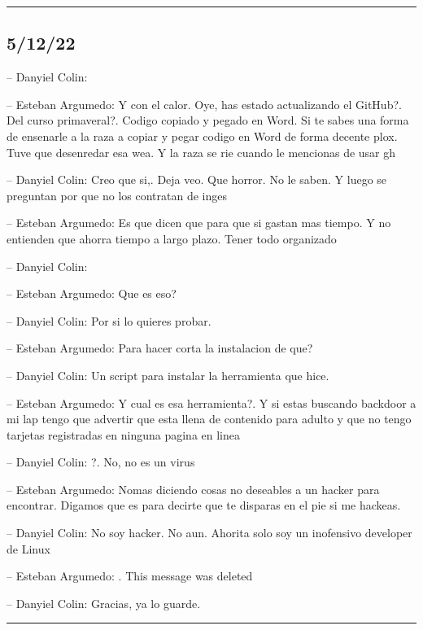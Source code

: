\begin{center}\rule{0.5\linewidth}{0.5pt}\end{center}

\hypertarget{section-76}{%
\subsection{5/12/22}\label{section-76}}

-- Danyiel Colin:

-- Esteban Argumedo: Y con el calor. Oye, has estado actualizando el
GitHub?. Del curso primaveral?. Codigo copiado y pegado en Word. Si te
sabes una forma de ensenarle a la raza a copiar y pegar codigo en Word
de forma decente plox. Tuve que desenredar esa wea. Y la raza se rie
cuando le mencionas de usar gh

-- Danyiel Colin: Creo que si,. Deja veo. Que horror. No le saben. Y
luego se preguntan por que no los contratan de inges

-- Esteban Argumedo: Es que dicen que para que si gastan mas tiempo. Y
no entienden que ahorra tiempo a largo plazo. Tener todo organizado

-- Danyiel Colin:

-- Esteban Argumedo: Que es eso?

-- Danyiel Colin: Por si lo quieres probar.

-- Esteban Argumedo: Para hacer corta la instalacion de que?

-- Danyiel Colin: Un script para instalar la herramienta que hice.

-- Esteban Argumedo: Y cual es esa herramienta?. Y si estas buscando
backdoor a mi lap tengo que advertir que esta llena de contenido para
adulto y que no tengo tarjetas registradas en ninguna pagina en linea

-- Danyiel Colin: ?. No, no es un virus

-- Esteban Argumedo: Nomas diciendo cosas no deseables a un hacker para
encontrar. Digamos que es para decirte que te disparas en el pie si me
hackeas.

-- Danyiel Colin: No soy hacker. No aun. Ahorita solo soy un inofensivo
developer de Linux

-- Esteban Argumedo: . This message was deleted

-- Danyiel Colin: Gracias, ya lo guarde.

\begin{center}\rule{0.5\linewidth}{0.5pt}\end{center}

